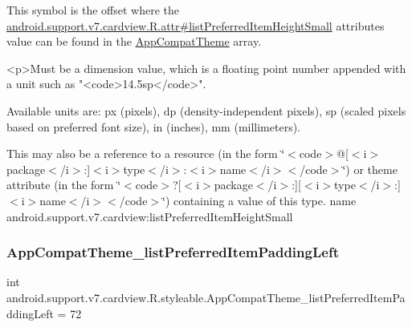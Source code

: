 This symbol is the offset where the \hyperlink{classandroid_1_1support_1_1v7_1_1cardview_1_1R_1_1attr_aa08a6c18bbbeafe82c27115aad7a9682}{android.\+support.\+v7.\+cardview.\+R.\+attr\#list\+Preferred\+Item\+Height\+Small} attribute\textquotesingle{}s value can be found in the \hyperlink{classandroid_1_1support_1_1v7_1_1cardview_1_1R_1_1styleable_a52e6f69f954ecc2622d72c0b4d298938}{App\+Compat\+Theme} array.

\begin{DoxyVerb}      <p>Must be a dimension value, which is a floating point number appended with a unit such as "<code>14.5sp</code>".
\end{DoxyVerb}
 Available units are\+: px (pixels), dp (density-\/independent pixels), sp (scaled pixels based on preferred font size), in (inches), mm (millimeters). 

This may also be a reference to a resource (in the form \char`\"{}$<$code$>$@\mbox{[}$<$i$>$package$<$/i$>$\+:\mbox{]}$<$i$>$type$<$/i$>$\+:$<$i$>$name$<$/i$>$$<$/code$>$\char`\"{}) or theme attribute (in the form \char`\"{}$<$code$>$?\mbox{[}$<$i$>$package$<$/i$>$\+:\mbox{]}\mbox{[}$<$i$>$type$<$/i$>$\+:\mbox{]}$<$i$>$name$<$/i$>$$<$/code$>$\char`\"{}) containing a value of this type.  name android.\+support.\+v7.\+cardview\+:list\+Preferred\+Item\+Height\+Small \mbox{\label{classandroid_1_1support_1_1v7_1_1cardview_1_1R_1_1styleable_ae88ee6cfa6fa7463687b22b65c5090eb}} 
\subsubsection{\texorpdfstring{App\+Compat\+Theme\+\_\+list\+Preferred\+Item\+Padding\+Left}{AppCompatTheme\_listPreferredItemPaddingLeft}}
{\footnotesize\ttfamily int android.\+support.\+v7.\+cardview.\+R.\+styleable.\+App\+Compat\+Theme\+\_\+list\+Preferred\+Item\+Padding\+Left = 72\hspace{0.3cm}{\ttfamily [static]}}

